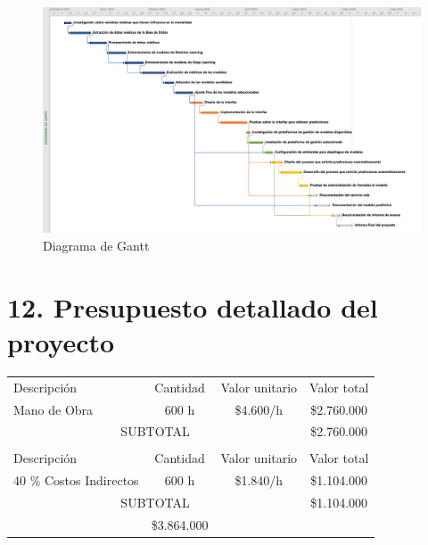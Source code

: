 \documentclass[
11pt, %
]{charter}
\begin{document}
\begin{landscape}
\begin{figure}[htpb]
\centering 
\includegraphics[height=.9\textheight]{./Figuras/Gantt-2.png}
\caption{Diagrama de Gantt}
\label{fig:diagGantt02}
\end{figure}

\end{landscape}

\section{12. Presupuesto detallado del proyecto}
\label{sec:presupuesto}

\begin{table}[htpb]
\centering
\begin{tabularx}{\linewidth}{@{}|X|c|r|r|@{}}
\hline
\rowcolor[HTML]{C0C0C0} 
\multicolumn{4}{|c|}{\cellcolor[HTML]{C0C0C0}COSTOS DIRECTOS} \\ \hline
\rowcolor[HTML]{C0C0C0} 
Descripción &
  \multicolumn{1}{c|}{\cellcolor[HTML]{C0C0C0}Cantidad} &
  \multicolumn{1}{c|}{\cellcolor[HTML]{C0C0C0}Valor unitario} &
  \multicolumn{1}{c|}{\cellcolor[HTML]{C0C0C0}Valor total} \\ \hline
  
 Mano de Obra &
  \multicolumn{1}{c|}{600 h} &
  \multicolumn{1}{c|}{\$4.600/h} &
  \multicolumn{1}{c|}{\$2.760.000} \\ \hline
\multicolumn{3}{|c|}{SUBTOTAL} &
  \multicolumn{1}{c|}{\$2.760.000} \\ \hline
\rowcolor[HTML]{C0C0C0} 
\multicolumn{4}{|c|}{\cellcolor[HTML]{C0C0C0}COSTOS INDIRECTOS} \\ \hline
\rowcolor[HTML]{C0C0C0} 
Descripción &
  \multicolumn{1}{c|}{\cellcolor[HTML]{C0C0C0}Cantidad} &
  \multicolumn{1}{c|}{\cellcolor[HTML]{C0C0C0}Valor unitario} &
  \multicolumn{1}{c|}{\cellcolor[HTML]{C0C0C0}Valor total} \\ \hline
\multicolumn{1}{|l|}{40 \% Costos Indirectos} &
 \multicolumn{1}{c|}{600 h} &
  \multicolumn{1}{c|}{\$1.840/h} &
  \multicolumn{1}{c|}{\$1.104.000} \\ \hline
\multicolumn{3}{|c|}{SUBTOTAL} &
  \multicolumn{1}{c|}{\$1.104.000} \\ \hline
\rowcolor[HTML]{C0C0C0}
\multicolumn{3}{|c|}{TOTAL} & \$3.864.000
   \\ \hline
\end{tabularx}%
\end{table}
\end{document}
